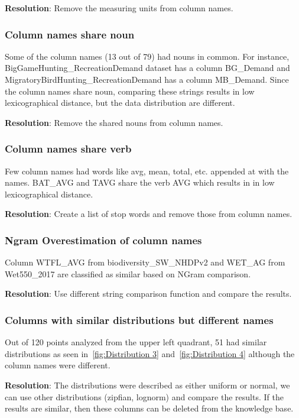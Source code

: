 \textbf{Resolution}: Remove the measuring units from column names.

\subsubsection{Column names share noun}
Some of the column names (13 out of 79) had nouns in common. For instance, BigGameHunting\_RecreationDemand dataset has a column BG\_Demand and MigratoryBirdHunting\_RecreationDemand has a column MB\_Demand. Since the column names share noun, comparing these strings results in low lexicographical distance, but the data distribution are different.

\textbf{Resolution}: Remove the shared nouns from column names.


\subsubsection{Column names share verb}

Few column names had words like avg, mean, total, etc. appended at with the names. BAT\_AVG and TAVG share the verb AVG which results in in low lexicographical distance.

\textbf{Resolution}: Create a list of stop words and remove those from column names.

\subsubsection{Ngram Overestimation of column names}
Column WTFL\_AVG from biodiversity\_SW\_NHDPv2 and WET\_AG from Wet550\_2017 are classified as similar based on NGram comparison. 

\textbf{Resolution}: Use different string comparison function and compare the results.

\subsubsection{Columns with similar distributions but different names}
Out of 120 points analyzed from the upper left quadrant, 51 had similar distributions as seen in~\ref{fig:Distribution 3} and~\ref{fig:Distribution 4} although the column names were different.

\textbf{Resolution}: The distributions were described as either uniform or normal, we can use other distributions (zipfian, lognorm) and compare the results. If the results are similar, then these columns can be deleted from the knowledge base.

